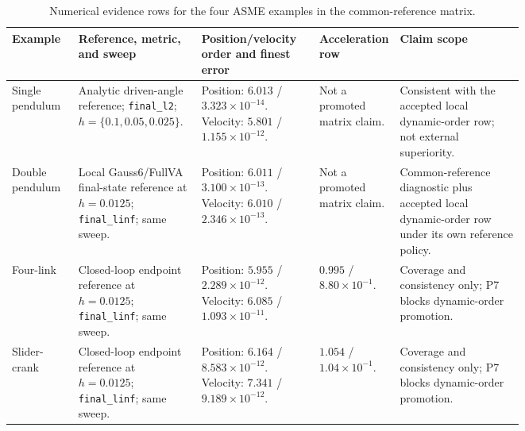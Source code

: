 \documentclass[10pt]{article}
\newcommand{\method}{Gauss6/FullVA}
\begin{document}
\begin{table}[H]
\centering
\caption{Numerical evidence rows for the four ASME examples in the common-reference matrix.}
\label{tab:asme_numeric_rows}
\scriptsize
\begin{tabularx}{\linewidth}{>{\raggedright\arraybackslash}p{0.13\linewidth}>{\raggedright\arraybackslash}p{0.24\linewidth}>{\raggedright\arraybackslash}p{0.23\linewidth}>{\raggedright\arraybackslash}p{0.15\linewidth}Y}
\toprule
\textbf{Example} & \textbf{Reference, metric, and sweep} & \textbf{Position/velocity order and finest error} & \textbf{Acceleration row} & \textbf{Claim scope} \\
\midrule
Single pendulum & Analytic driven-angle reference; \texttt{final\_l2}; $h=\{0.1,0.05,0.025\}$. & Position: $6.013$ / $3.323{\times}10^{-14}$. Velocity: $5.801$ / $1.155{\times}10^{-12}$. & Not a promoted matrix claim. & Consistent with the accepted local dynamic-order row; not external superiority. \\
Double pendulum & Local \method{} final-state reference at $h=0.0125$; \texttt{final\_linf}; same sweep. & Position: $6.011$ / $3.100{\times}10^{-13}$. Velocity: $6.010$ / $2.346{\times}10^{-13}$. & Not a promoted matrix claim. & Common-reference diagnostic plus accepted local dynamic-order row under its own reference policy. \\
Four-link & Closed-loop endpoint reference at $h=0.0125$; \texttt{final\_linf}; same sweep. & Position: $5.955$ / $2.289{\times}10^{-12}$. Velocity: $6.085$ / $1.093{\times}10^{-11}$. & $0.995$ / $8.80{\times}10^{-1}$. & Coverage and consistency only; P7 blocks dynamic-order promotion. \\
Slider-crank & Closed-loop endpoint reference at $h=0.0125$; \texttt{final\_linf}; same sweep. & Position: $6.164$ / $8.583{\times}10^{-12}$. Velocity: $7.341$ / $9.189{\times}10^{-12}$. & $1.054$ / $1.04{\times}10^{-1}$. & Coverage and consistency only; P7 blocks dynamic-order promotion. \\
\bottomrule
\end{tabularx}
\end{table}
\end{document}
